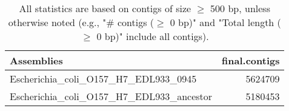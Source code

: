 \documentclass[12pt,a4paper]{article}
\begin{document}
\begin{table}[ht]
\begin{center}
\caption{All statistics are based on contigs of size $\geq$ 500 bp, unless otherwise noted (e.g., "\# contigs ($\geq$ 0 bp)" and "Total length ($\geq$ 0 bp)" include all contigs).}
\begin{tabular}{|l*{1}{|r}|}
\hline
Assemblies & final.contigs \\ \hline
Escherichia\_coli\_O157\_H7\_EDL933\_0945 & 5624709 \\ \hline
Escherichia\_coli\_O157\_H7\_EDL933\_ancestor & 5180453 \\ \hline
\end{tabular}
\end{center}
\end{table}
\end{document}
